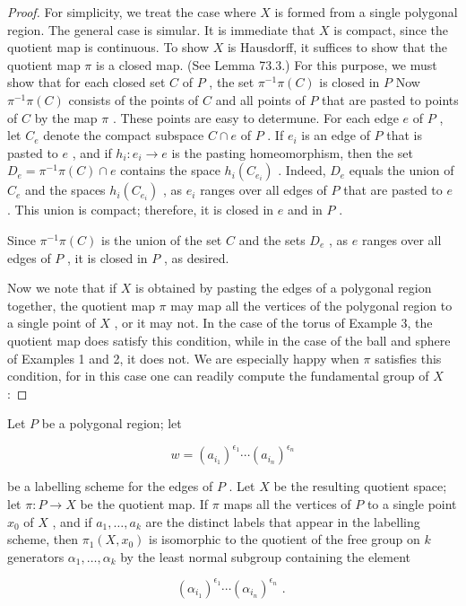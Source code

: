 \begin{proof}For simplicity, we treat the case where \(X\) is formed from a single polygonal region. The general case is simular.
It is immediate that \(X\) is compact, since the quotient map is continuous. To show \(X\) is Hausdorff, it suffices to show that the quotient map \(\pi\) is a closed map. (See Lemma 73.3.) For this purpose, we must show that for each closed set \(C\) of \(P\) , the set \({\pi }^{-1}\pi \left( C\right)\) is closed in \(P\) Now \({\pi }^{-1}\pi \left( C\right)\) consists of the points of \(C\) and all points of \(P\) that are pasted to points of \(C\) by the map \(\pi\) . These points are easy to determune. For each edge \(e\) of \(P\) , let \({C}_{e}\) denote the compact subspace \(C \cap  e\) of \(P\) . If \({e}_{i}\) is an edge of \(P\) that is pasted to \(e\) , and if \({h}_{i} : {e}_{i} \rightarrow  e\) is the pasting homeomorphism, then the set \({D}_{e} = {\pi }^{-1}\pi \left( C\right)  \cap  e\) contains the space \({h}_{i}\left( {C}_{{e}_{i}}\right)\) . Indeed, \({D}_{e}\) equals the union of \({C}_{e}\) and the spaces \({h}_{i}\left( {C}_{{e}_{i}}\right)\) , as \({e}_{i}\) ranges over all edges of \(P\) that are pasted to \(e\) . This union is compact; therefore, it is closed in \(e\) and in \(P\) .

Since \({\pi }^{-1}\pi \left( C\right)\) is the union of the set \(C\) and the sets \({D}_{e}\) , as \(e\) ranges over all edges of \(P\) , it is closed in \(P\) , as desired.

Now we note that if \(X\) is obtained by pasting the edges of a polygonal region together, the quotient map \(\pi\) may map all the vertices of the polygonal region to a single point of \(X\) , or it may not. In the case of the torus of Example 3, the quotient map does satisfy this condition, while in the case of the ball and sphere of Examples 1 and 2, it does not. We are especially happy when \(\pi\) satisfies this condition, for in this case one can readily compute the fundamental group of \(X\) :
\end{proof}
\begin{theorem} Let \(P\) be a polygonal region; let

\[
w = {\left( {a}_{{i}_{1}}\right) }^{{\epsilon }_{1}}\cdots {\left( {a}_{{i}_{n}}\right) }^{{\epsilon }_{n}}
\]

be a labelling scheme for the edges of \(P\) . Let \(X\) be the resulting quotient space; let \(\pi  : P \rightarrow  X\) be the quotient map. If \(\pi\) maps all the vertices of \(P\) to a single point \({x}_{0}\) of \(X\) , and if \({a}_{1},\ldots ,{a}_{k}\) are the distinct labels that appear in the labelling scheme, then \({\pi }_{1}\left( {X,{x}_{0}}\right)\) is isomorphic to the quotient of the free group on \(k\) generators \({\alpha }_{1},\ldots ,{\alpha }_{k}\) by the least normal subgroup containing the element

\[
{\left( {\alpha }_{{i}_{1}}\right) }^{{\epsilon }_{1}}\cdots {\left( {\alpha }_{{i}_{n}}\right) }^{{\epsilon }_{n}}\text{ . }
\]
\end{theorem}

